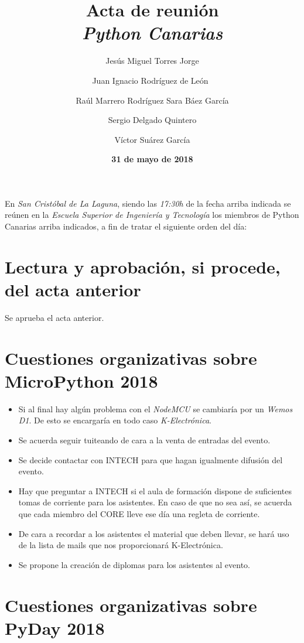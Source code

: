 \documentclass[a4paper, 12pt]{article}
\title{\huge \textbf{Acta de reunión} \\ \textit{Python Canarias}}
\date{\textbf{31 de mayo de 2018}}
\author{
    Jesús Miguel Torres Jorge \and
    Juan Ignacio Rodríguez de León\ \and 
    Raúl Marrero Rodríguez
    Sara Báez García \and
    Sergio Delgado Quintero \and 
    Víctor Suárez García \and 
}
\begin{document}
\renewcommand{\contentsname}{Orden del día}

\maketitle

En \textit{San Cristóbal de La Laguna}, siendo las \textit{17:30h} de la fecha arriba indicada se reúnen en la \textit{Escuela Superior de Ingeniería y Tecnología} los miembros de Python Canarias arriba indicados, a fin de tratar el siguiente orden del día:

\tableofcontents

\section{Lectura y aprobación, si procede, del acta anterior}

Se aprueba el acta anterior.

\section{Cuestiones organizativas sobre MicroPython 2018}

\begin{itemize}
    \item Si al final hay algún problema con el \textit{NodeMCU} se cambiaría por un \textit{Wemos D1}. De esto se encargaría en todo caso \textit{K-Electrónica}.
    \item Se acuerda seguir tuiteando de cara a la venta de entradas del evento.
    \item Se decide contactar con INTECH para que hagan igualmente difusión del evento.
    \item Hay que preguntar a INTECH si el aula de formación dispone de suficientes tomas de corriente para los asistentes. En caso de que no sea así, se acuerda que cada miembro del CORE lleve ese día una regleta de corriente.
    \item De cara a recordar a los asistentes el material que deben llevar, se hará uso de la lista de mails que nos proporcionará K-Electrónica.
    \item Se propone la creación de diplomas para los asistentes al evento.
\end{itemize}

\section{Cuestiones organizativas sobre PyDay 2018}
\end{document}

